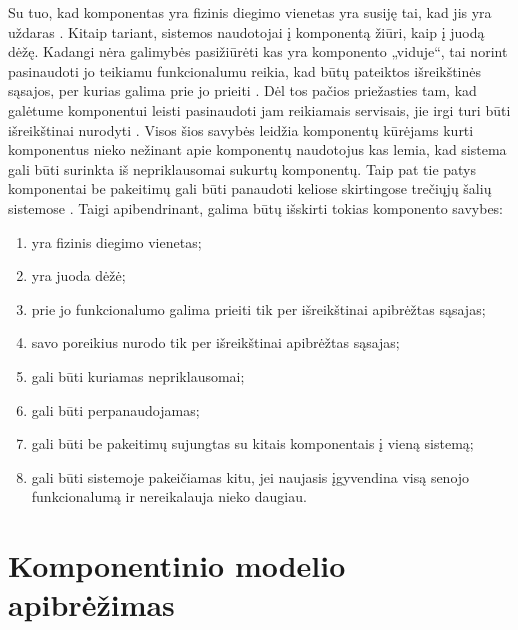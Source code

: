 Su tuo, kad komponentas yra fizinis diegimo vienetas yra susiję
tai, kad jis yra uždaras
\cite[36]{cs-beyond-object-oriented-programming}. Kitaip tariant,
sistemos naudotojai į komponentą žiūri, kaip į juodą
dėžę\cite[2]{Gill:2003:CMF:966221.966237}.
Kadangi nėra galimybės pasižiūrėti kas yra komponento „viduje“,
tai norint pasinaudoti jo teikiamu funkcionalumu reikia, kad būtų
pateiktos išreikštinės sąsajos, per kurias galima prie jo
prieiti\cite[387]{objects-components-and-frameworks-with-uml}
\cite[36]{cs-beyond-object-oriented-programming}. Dėl tos
pačios priežasties tam, kad galėtume komponentui leisti pasinaudoti
jam reikiamais servisais, jie irgi turi būti išreikštinai nurodyti
\cite[387]{objects-components-and-frameworks-with-uml}
\cite[36]{cs-beyond-object-oriented-programming}. Visos šios
savybės leidžia komponentų kūrėjams kurti komponentus nieko
nežinant apie komponentų naudotojus\cite[2]{Gill:2003:CMF:966221.966237}
\cite[139]{meyer1999components}
kas lemia, kad sistema gali būti surinkta iš nepriklausomai sukurtų
komponentų. Taip pat tie patys komponentai be pakeitimų gali būti
panaudoti keliose skirtingose trečiųjų šalių sistemose
\cite[388]{objects-components-and-frameworks-with-uml}
\cite[36]{cs-beyond-object-oriented-programming}. Taigi
apibendrinant, galima būtų išskirti tokias komponento savybes:
\begin{enumerate}
  \item \label{com:exe:deployment} yra fizinis diegimo vienetas;
  \item \label{com:exe:blackbox} yra juoda dėžė;
  \item \label{com:exe:interfaceprovider} prie jo funkcionalumo galima
    prieiti tik per išreikštinai apibrėžtas sąsajas;
  \item \label{com:exe:interfaceuser} savo poreikius nurodo tik per
    išreikštinai apibrėžtas sąsajas;
  \item \label{com:exe:independent} gali būti kuriamas nepriklausomai;
  \item \label{com:exe:reusable} gali būti perpanaudojamas;
  \item \label{com:exe:composed} gali būti be pakeitimų sujungtas su
    kitais komponentais į vieną sistemą;
  \item \label{com:exe:interchangable} gali būti sistemoje
    pakeičiamas kitu, jei naujasis įgyvendina visą senojo
    funkcionalumą ir nereikalauja nieko daugiau.
\end{enumerate}

\section{Komponentinio modelio apibrėžimas}

